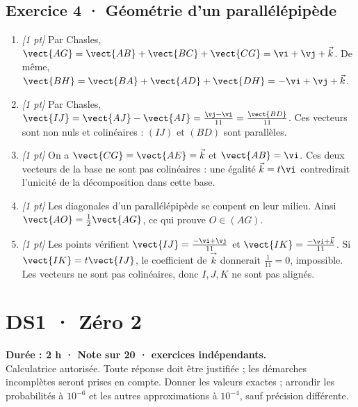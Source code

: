 \subsection*{Exercice 4 · Géométrie d'un parallélépipède}\begin{enumerate}

\item \textit{[1 pt]} Par Chasles, $\vect{AG}=\vect{AB}+\vect{BC}+\vect{CG}=\vi +\vj +\vec k$. De même, $\vect{BH}=\vect{BA}+\vect{AD}+\vect{DH}=-\vi +\vj +\vec k$.

\item \textit{[1 pt]} Par Chasles, $\vect{IJ}=\vect{AJ}-\vect{AI}=\frac{\vj -\vi }{11}=\frac{\vect{BD}}{11}$. Ces vecteurs sont non nuls et colinéaires : $(IJ)$ et $(BD)$ sont parallèles.

\item \textit{[1 pt]} On a $\vect{CG}=\vect{AE}=\vec k$ et $\vect{AB}=\vi $. Ces deux vecteurs de la base ne sont pas colinéaires : une égalité $\vec k=t\vi $ contredirait l'unicité de la décomposition dans cette base.

\item \textit{[1 pt]} Les diagonales d'un parallélépipède se coupent en leur milieu. Ainsi $\vect{AO}=\frac12\vect{AG}$, ce qui prouve $O\in(AG)$.

\item \textit{[1 pt]} Les points vérifient $\vect{IJ}=\frac{-\vi +\vj }{11}$ et $\vect{IK}=\frac{-\vi +\vec k}{11}$. Si $\vect{IK}=t\vect{IJ}$, le coefficient de $\vec k$ donnerait $\frac{1}{11}=0$, impossible. Les vecteurs ne sont pas colinéaires, donc $I,J,K$ ne sont pas alignés.

\end{enumerate}

\fi

\mxnewpage{}\label{sujet:1-2}

\section*{DS1 · Zéro 2}


\textbf{Durée : 2 h · Note sur 20 ·  exercices indépendants.}\\Calculatrice autorisée. Toute réponse doit être justifiée ; les démarches incomplètes seront prises en compte. Donner les valeurs exactes ; arrondir les probabilités à $10^{-6}$ et les autres approximations à $10^{-4}$, sauf précision différente.

